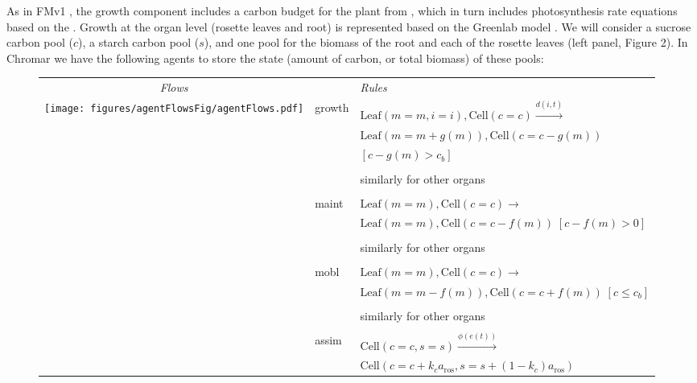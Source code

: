 \documentclass[phd]{infthesis}
\begin{document}
As in FMv1 \citep{chew_multiscale_2014}, the growth component includes a carbon
budget for the plant from \citet{rasse_leaf_2006}, which in turn includes
photosynthesis rate equations based on the \citet{farquhar_biochemical_1980}
. Growth at the organ level (rosette leaves and root) is represented based on
the Greenlab model \citep{christophe_model-based_2008}. We will consider a
sucrose carbon pool (\(c\)), a starch carbon pool (\(s\)), and one pool for the
biomass of the root and each of the rosette leaves (left panel, ­­­Figure 2). In
Chromar we have the following agents to store the state (amount of carbon, or
total biomass) of these pools:

\begin{figure}[!ht]
\centering
\begin{tabularx}{0.95\textwidth}{c|ll} 
\toprule
\addlinespace[0.25cm]
\textsf{\emph{Flows}} & & \textsf{\emph{Rules}} \\ 
\multirow{10}[45]{*}{\texttt{[image: figures/agentFlowsFig/agentFlows.pdf]}} & \textsf{growth}&  $\mathrm{Leaf}(m=m, i=i), \mathrm{Cell}(c=c) \xrightarrow{d(i, t)}$ \\
& & $\mathrm{Leaf}(m=m+g(m)), \mathrm{Cell}(c=c-g(m))$ \\ 
& & $[c-g(m) > c_b]$ \\
& & \\
\addlinespace[-0.6em]
& & similarly for other organs \\ 
& & \\
& \textsf{maint} & $\mathrm{Leaf}(m=m), \mathrm{Cell}(c=c) \xrightarrow{}$ \\
& & $\mathrm{Leaf}(m=m), \mathrm{Cell}(c=c-f(m)) \; [c-f(m) > 0]$ \\
& & \\
\addlinespace[-0.6em]
& & similarly for other organs \\ 
& & \\
& \textsf{mobl} & $\mathrm{Leaf}(m=m), \mathrm{Cell}(c=c) \xrightarrow{}$ \\
& & $\mathrm{Leaf}(m=m-f(m)), \mathrm{Cell}(c=c+f(m)) \; [c \leq c_b]$ \\
& & \\
\addlinespace[-0.6em]
& & similarly for other organs \\ 
& & \\
& \textsf{assim} & $\mathrm{Cell}(c=c, s=s) \xrightarrow{\phi(e(t))}$ \\
& & $\mathrm{Cell}(c=c+k_c a_{\mathrm{ros}}, s=s+(1-k_c) a_{\mathrm{ros}}) $ \\

\end{tabularx}
\end{figure}
\end{document}
